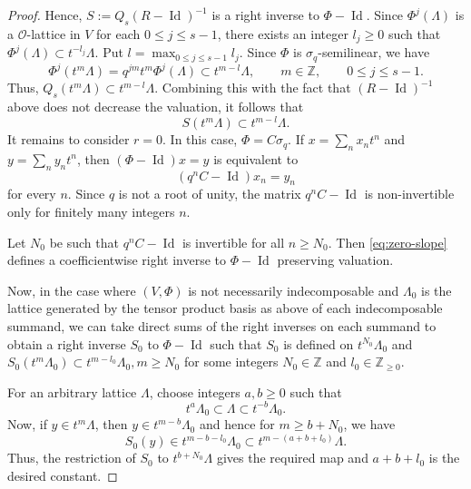 \documentclass[11pt]{amsart}
\numberwithin{equation}{section}
\theoremstyle{definition}
\theoremstyle{remark}
\DeclareMathOperator{\Id}{Id}
\begin{document}
\begin{proof}

Hence, $S:=Q_s(R-\operatorname{Id})^{-1}$ is a right inverse to $\Phi-\operatorname{Id}$.
Since $\Phi^j(\Lambda)$ is a $\mathcal O$-lattice in $V$ for each $0\leq j\leq s-1$, there exists an integer $l_j\geq0$ such that $ \Phi^j(\Lambda)\subset t^{-l_j}\Lambda.$ Put $l=\max_{0\leq j\leq s-1}l_j.$ Since $\Phi$ is $\sigma_q$-semilinear, we have
\[
  \Phi^j(t^m\Lambda)
  =
  q^{jm}t^m\Phi^j(\Lambda)
  \subset t^{m-l}\Lambda,
  \qquad
  m\in\mathbb Z,
  \qquad 0\leq j\leq s-1.
\]
Thus, $Q_s(t^m\Lambda)\subset t^{m-l}\Lambda$. Combining this with the fact that $(R-\operatorname{Id})^{-1}$ above does not decrease the valuation, it follows
that
\[
  S(t^m\Lambda)\subset t^{m-l}\Lambda.
\]
It remains to consider $r=0$. In this case, $\Phi=C\sigma_q$.
If
$x=\sum_nx_nt^n$ and $y=\sum_ny_nt^n$, then
$(\Phi-\operatorname{Id})x=y$ is equivalent to
\begin{equation}\label{eq:zero-slope}
  (q^nC-\operatorname{Id})x_n=y_n
\end{equation}
for every $n$. Since $q$ is not a root of unity, the matrix $q^nC-\operatorname{Id}$ is non-invertible only for finitely many integers $n$.

Let $N_0$ be such that $q^nC-\Id$ is invertible for all $n\geq N_0$. Then
\eqref{eq:zero-slope} defines a coefficientwise right inverse to $\Phi-\Id$ preserving
valuation.

Now, in the case where $(V,\Phi)$ is not necessarily indecomposable and $\Lambda_0$ is the lattice generated by the tensor product basis as above of each indecomposable summand, we can take direct sums of the right inverses on each summand to obtain a right inverse $S_{0}$ to $\Phi-\Id$ such that $S_0$ is defined on $t^{N_{0}}\Lambda_0$ and $S_0(t^m\Lambda_0)\subset t^{m-l_0}\Lambda_0, m\geq N_0$ for some integers $N_0\in\mathbb{Z}$ and $l_0\in\mathbb{Z}_{\geq0}$.

For an arbitrary lattice $\Lambda$, choose integers $a,b\geq0$ such that
\[
  t^a\Lambda_0\subset\Lambda\subset t^{-b}\Lambda_0.
\] 
Now, if $y\in t^m\Lambda$, then
$y\in t^{m-b}\Lambda_0$ and hence for $m\geq b+N_0$, we have
\[
  S_0(y)\in t^{m-b-l_0}\Lambda_0
  \subset t^{m-(a+b+l_0)}\Lambda.
\]
Thus, the restriction of $S_0$ to $t^{b+N_0}\Lambda$ gives the required map and $a+b+l_0$ is the desired constant.
\end{proof}
\end{document}
